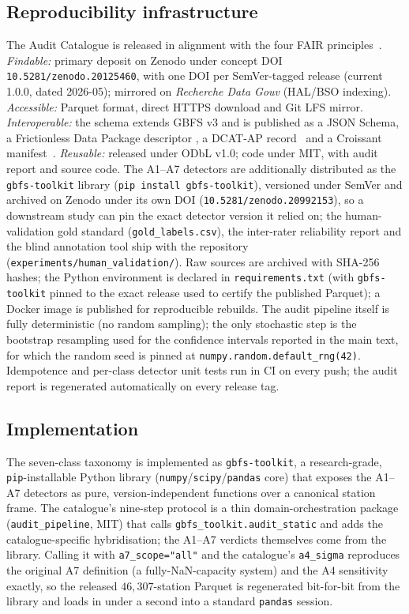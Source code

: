 \documentclass[11pt,a4paper]{article}
\newif\ifanonymous
\newcommand{\zdoi}{\ifanonymous\texttt{[deposited on Zenodo; DOI withheld for review]}\else\texttt{10.5281/zenodo.20125460}\fi}
\newcommand{\toolkitdoi}{\ifanonymous\texttt{[reference-implementation library archived on Zenodo; DOI withheld for review]}\else\texttt{10.5281/zenodo.20992153}\fi}
\begin{document}
\subsection{Reproducibility infrastructure}\label{secRepro}
The Audit Catalogue is released in alignment with the four FAIR
principles~\cite{Wilkinson2016}. \emph{Findable:} primary deposit on
Zenodo under concept DOI \zdoi, with one
DOI per SemVer-tagged release (current 1.0.0, dated 2026-05); mirrored
on \emph{Recherche Data Gouv} (HAL/BSO indexing). \emph{Accessible:}
Parquet format, direct HTTPS download and Git LFS mirror.
\emph{Interoperable:} the schema extends GBFS v3 and is published as a
JSON Schema, a Frictionless Data Package descriptor
\cite{FrictionlessData2023}, a DCAT-AP record~\cite{DCATAP2021} and a
Croissant manifest~\cite{Croissant2024}. \emph{Reusable:} released
under ODbL v1.0; code under MIT, with audit report and source code. The
A1--A7 detectors are additionally distributed as the \texttt{gbfs-toolkit}
library (\texttt{pip install gbfs-toolkit}), versioned under SemVer and
archived on Zenodo under its own DOI (\toolkitdoi), so a downstream study
can pin the exact detector version it relied on; the
human-validation gold standard (\texttt{gold\_labels.csv}), the
inter-rater reliability report and the blind annotation tool ship with the
repository (\texttt{experiments/human\_validation/}).
Raw sources are archived with SHA-256 hashes; the Python
environment is declared in \texttt{requirements.txt} (with
\texttt{gbfs-toolkit} pinned to the exact release used to certify the
published Parquet); a Docker image is published for reproducible rebuilds. The audit pipeline itself
is fully deterministic (no random sampling); the only stochastic
step is the bootstrap resampling used for the confidence intervals
reported in the main text, for which the random seed is pinned at
\texttt{numpy.random.default\_rng(42)}. Idempotence and per-class
detector unit tests run in CI on every push; the audit report is
regenerated automatically on every release tag.

\subsection{Implementation}
The seven-class taxonomy is implemented as \texttt{gbfs-toolkit}, a
research-grade, \texttt{pip}-installable Python library
(\texttt{numpy}/\texttt{scipy}/\texttt{pandas} core) that exposes the
A1--A7 detectors as pure, version-independent functions over a canonical
station frame. The catalogue's nine-step protocol is a thin
domain-orchestration package (\texttt{audit\_pipeline}, MIT) that calls
\texttt{gbfs\_toolkit.audit\_static} and adds the catalogue-specific
hybridisation; the A1--A7 verdicts themselves come from the library.
Calling it with \texttt{a7\_scope="all"} and the catalogue's
\texttt{a4\_sigma} reproduces the original A7 definition (a
fully-NaN-capacity system) and the A4 sensitivity exactly, so the
released $46{,}307$-station Parquet is regenerated bit-for-bit from the
library and loads in under a second into a standard \texttt{pandas}
session.
\end{document}
